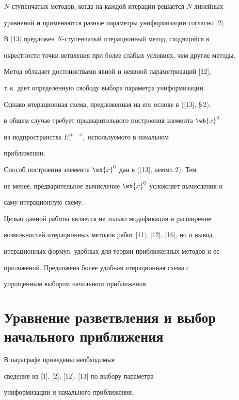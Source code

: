 $N$-ступенчатых методов, когда на каждой итерации решается $N$ линейных


уравнений и применяются разные параметры униформизации согласно [2].


В [13] предложен $N$-ступенчатый итерационный метод, сходящийся в


окрестности точки ветвления при более слабых условиях, чем другие методы.


Метод обладает достоинствами явной и неявной параметризаций [12],


т.\,к. дает определенную свободу выбора параметра униформизации.


Однако итерационная схема, предложенная на его основе в ([13], \S\,2),


в общем случае требует предварительного построения элемента $\wh{x}^0$


из подпространства $E^{\infty-n}_1,$ используемого в начальном


приближении.


Способ построения элемента $\wh{x}^0$ дан в ([13], леммa 2). Тем


не менее, предварительное вычисление $\wh{x}^0$ усложняет вычисления и


саму итерационную схему.





Целью данной работы является не только модификация и расширение


возможностей итерационных методов работ [11], [12], [16], но и вывод


итерационных формул, удобных для теории приближенных методов и ее


приложений. Предложена более удобная итерационная схема с


упрощенным выбором начального приближения.








\section{Уравнение разветвления и выбор начального приближения}





В параграфе приведены необходимые


сведения из [1], [2], [12], [13] по выбору параметра


униформизации и начального приближения.





